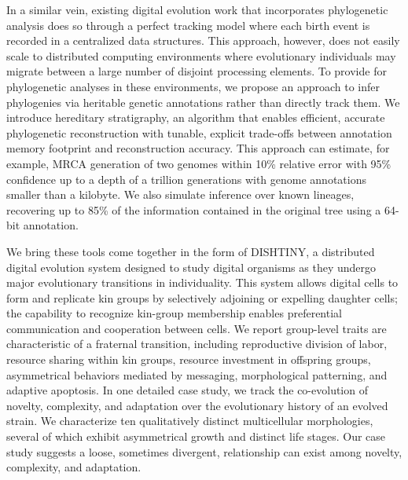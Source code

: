 In a similar vein, existing digital evolution work that incorporates phylogenetic analysis does so through a perfect tracking model where each birth event is recorded in a centralized data structures. 
This approach, however, does not easily scale to distributed computing environments where evolutionary individuals may migrate between a large number of disjoint processing elements.
To provide for phylogenetic analyses in these environments, we propose an approach to infer phylogenies via heritable genetic annotations rather than directly track them.
We introduce hereditary stratigraphy, an algorithm that enables efficient, accurate phylogenetic reconstruction with tunable, explicit trade-offs between annotation memory footprint and reconstruction accuracy.
This approach can estimate, for example, MRCA generation of two genomes within 10\% relative error with 95\% confidence up to a depth of a trillion generations with genome annotations smaller than a kilobyte.
We also simulate inference over known lineages, recovering up to 85\% of the information contained in the original tree using a 64-bit annotation.

We bring these tools come together in the form of DISHTINY, a distributed digital evolution system designed to study digital organisms as they undergo major evolutionary transitions in individuality.
This system allows digital cells to form and replicate kin groups by selectively adjoining or expelling daughter cells;
the capability to recognize kin-group membership enables preferential communication and cooperation between cells.
We report group-level traits are characteristic of a fraternal transition, including reproductive division of labor, resource sharing within kin groups, resource investment in offspring groups, asymmetrical behaviors mediated by messaging, morphological patterning, and adaptive apoptosis.
In one detailed case study, we track the co-evolution of novelty, complexity, and adaptation over the evolutionary history of an evolved strain.
We characterize ten qualitatively distinct multicellular morphologies, several of which exhibit asymmetrical growth and distinct life stages.
Our case study suggests a loose, sometimes divergent, relationship can exist among novelty, complexity, and adaptation.
